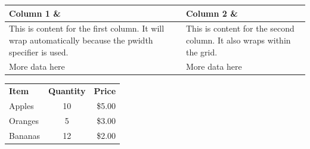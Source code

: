 \documentclass{article}
\begin{document}
\begin{tabular}{|p{}|p{}|}
\hline
\textbf{Column 1 \&} & \textbf{Column 2 \&} \\
\hline
This is content for the first column. It will wrap automatically because the p{width} specifier is used. & This is content for the second column. It also wraps within the grid. \\
\hline
More data here & More data here \\
\hline
\end{tabular}
\newline
\newline
\newline
\newline


\begin{tabular}{lcr}
    \textbf{Item} & \textbf{Quantity} & \textbf{Price} \\
    Apples & 10 & \$5.00 \\
    Oranges & 5 & \$3.00 \\
    Bananas & 12 & \$2.00 \\
\end{tabular}
\end{document}
